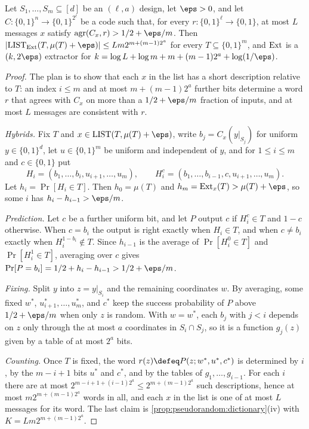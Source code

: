\begin{refsection}
\begin{theorem}\label{thm:pseudorandom:trevisan}
Let $S_1,\dots,S_m\subseteq[d]$ be an $(\ell,a)$ design, let $\eps>0$, and let $C\colon\{0,1\}^n\to\{0,1\}^{2^\ell}$ be a code such that, for every $r\colon\{0,1\}^\ell\to\{0,1\}$, at most $L$ messages $x$ satisfy $\pseudorandomAgr(C_x,r)>1/2+\eps/m$. Then $|\pseudorandomList_{\pseudorandomExt}(T,\mu(T)+\eps)|\le Lm2^{m+(m-1)2^a}$ for every $T\subseteq\{0,1\}^m$, and $\operatorname{Ext}$ is a $(k,2\eps)$ extractor for $k=\log L+\log m+m+(m-1)2^a+\log(1/\eps)$.
\end{theorem}

\begin{proof}
The plan is to show that each $x$ in the list has a short description relative to $T$: an index $i\le m$ and at most $m+(m-1)2^a$ further bits determine a word $r$ that agrees with $C_x$ on more than a $1/2+\eps/m$ fraction of inputs, and at most $L$ messages are consistent with $r$.

\emph{Hybrids.} Fix $T$ and $x\in\pseudorandomList(T,\mu(T)+\eps)$, write $b_j=C_x(y|_{S_j})$ for uniform $y\in\{0,1\}^d$, let $u\in\{0,1\}^m$ be uniform and independent of $y$, and for $1\le i\le m$ and $c\in\{0,1\}$ put
\[
  H_i=(b_1,\dots,b_i,u_{i+1},\dots,u_m),\qquad H_i^c=(b_1,\dots,b_{i-1},c,u_{i+1},\dots,u_m).
\]
Let $h_i=\Pr[H_i\in T]$. Then $h_0=\mu(T)$ and $h_m=\pseudorandomExt_x(T)>\mu(T)+\eps$, so some $i$ has $h_i-h_{i-1}>\eps/m$.

\emph{Prediction.} Let $c$ be a further uniform bit, and let $P$ output $c$ if $H_i^c\in T$ and $1-c$ otherwise. When $c=b_i$ the output is right exactly when $H_i\in T$, and when $c\ne b_i$ exactly when $H_i^{1-b_i}\notin T$. Since $h_{i-1}$ is the average of $\Pr[H_i^0\in T]$ and $\Pr[H_i^1\in T]$, averaging over $c$ gives $\Pr[P=b_i]=1/2+h_i-h_{i-1}>1/2+\eps/m$.

\emph{Fixing.} Split $y$ into $z=y|_{S_i}$ and the remaining coordinates $w$. By averaging, some fixed $w^*$, $u^*_{i+1},\dots,u^*_m$, and $c^*$ keep the success probability of $P$ above $1/2+\eps/m$ when only $z$ is random. With $w=w^*$, each $b_j$ with $j<i$ depends on $z$ only through the at most $a$ coordinates in $S_i\cap S_j$, so it is a function $g_j(z)$ given by a table of at most $2^a$ bits.

\emph{Counting.} Once $T$ is fixed, the word $r(z)\defeq P(z;w^*,u^*,c^*)$ is determined by $i$, by the $m-i+1$ bits $u^*$ and $c^*$, and by the tables of $g_1,\dots,g_{i-1}$. For each $i$ there are at most $2^{m-i+1+(i-1)2^a}\le2^{m+(m-1)2^a}$ such descriptions, hence at most $m2^{m+(m-1)2^a}$ words in all, and each $x$ in the list is one of at most $L$ messages for its word. The last claim is \cref{prop:pseudorandom:dictionary}(iv) with $K=Lm2^{m+(m-1)2^a}$.
\end{proof}


\end{refsection}
